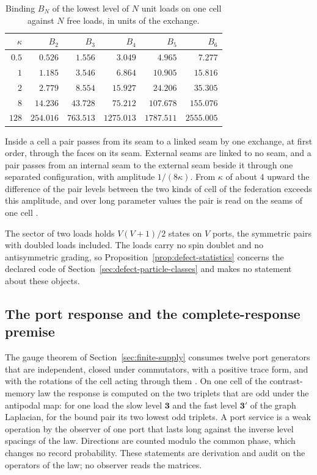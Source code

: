 \begin{table}[htbp]
\centering\small
\caption{Binding $B_N$ of the lowest level of $N$ unit loads on one cell against $N$ free
loads, in units of the exchange.}
\label{tab:psv-bindings}
\begin{tabular}{@{}rrrrrr@{}}
\toprule
$\kappa$ & $B_2$ & $B_3$ & $B_4$ & $B_5$ & $B_6$\\
\midrule
$0.5$ & $0.526$ & $1.556$ & $3.049$ & $4.965$ & $7.277$\\
$1$ & $1.185$ & $3.546$ & $6.864$ & $10.905$ & $15.816$\\
$2$ & $2.779$ & $8.554$ & $15.927$ & $24.206$ & $35.305$\\
$8$ & $14.236$ & $43.728$ & $75.212$ & $107.678$ & $155.076$\\
$128$ & $254.016$ & $763.513$ & $1275.013$ & $1787.511$ & $2555.005$\\
\bottomrule
\end{tabular}
\end{table}

Inside a cell a pair passes from its seam to a linked seam by one exchange, at first order,
through the faces on its seam. External seams are linked to no seam, and a pair passes
from an internal seam to the external seam beside it through one separated configuration,
with amplitude $1/(8\kappa)$. From $\kappa$ of about $4$ upward the difference of the pair
levels between the two kinds of cell of the federation exceeds this amplitude, and over
long parameter values the pair is read on the seams of one cell \cite{ophmodel}.

The sector of two loads holds $V(V+1)/2$ states on $V$ ports, the symmetric pairs with
doubled loads included. The loads carry no spin doublet and no antisymmetric grading, so
Proposition~\ref{prop:defect-statistics} concerns the declared code of
Section~\ref{sec:defect-particle-classes} and makes no statement about these objects.

\subsection{The port response and the complete-response premise}
\label{sec:psv-response}

The gauge theorem of Section~\ref{sec:finite-supply} consumes twelve port generators that
are independent, closed under commutators, with a positive trace form, and with the
rotations of the cell acting through them \cite{ophGauge}. On one cell of the
contrast-memory law the response is computed on the two triplets that are odd under the
antipodal map: for one load the slow level $\mathbf3$ and the fast level $\mathbf3'$ of
the graph Laplacian, for the bound pair its two lowest odd triplets. A port service is a
weak operation by the observer of one port that lasts long against the inverse level
spacings of the law. Directions are counted modulo the common phase, which changes no
record probability. These statements are derivation and audit on the operators of the
law; no observer reads the matrices.


